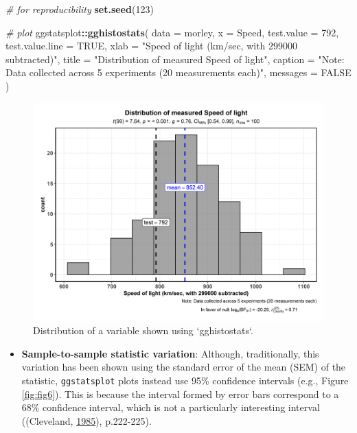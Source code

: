 \documentclass[]{article}
\newenvironment{Shaded}{\begin{snugshade}}{\end{snugshade}}
\newcommand{\CommentTok}[1]{\textcolor[rgb]{0.56,0.35,0.01}{\textit{#1}}}
\newcommand{\DataTypeTok}[1]{\textcolor[rgb]{0.13,0.29,0.53}{#1}}
\newcommand{\DecValTok}[1]{\textcolor[rgb]{0.00,0.00,0.81}{#1}}
\newcommand{\KeywordTok}[1]{\textcolor[rgb]{0.13,0.29,0.53}{\textbf{#1}}}
\newcommand{\NormalTok}[1]{#1}
\newcommand{\OperatorTok}[1]{\textcolor[rgb]{0.81,0.36,0.00}{\textbf{#1}}}
\newcommand{\OtherTok}[1]{\textcolor[rgb]{0.56,0.35,0.01}{#1}}
\newcommand{\StringTok}[1]{\textcolor[rgb]{0.31,0.60,0.02}{#1}}
\providecommand{\tightlist}{%
  \setlength{\itemsep}{0pt}\setlength{\parskip}{0pt}}
\begin{document}
\begin{Shaded}
\begin{Highlighting}[]
\CommentTok{# for reproducibility}
\KeywordTok{set.seed}\NormalTok{(}\DecValTok{123}\NormalTok{)}

\CommentTok{# plot}
\NormalTok{ggstatsplot}\OperatorTok{::}\KeywordTok{gghistostats}\NormalTok{(}
  \DataTypeTok{data =}\NormalTok{ morley,}
  \DataTypeTok{x =}\NormalTok{ Speed,}
  \DataTypeTok{test.value =} \DecValTok{792}\NormalTok{,}
  \DataTypeTok{test.value.line =} \OtherTok{TRUE}\NormalTok{,}
  \DataTypeTok{xlab =} \StringTok{"Speed of light (km/sec, with 299000 subtracted)"}\NormalTok{,}
  \DataTypeTok{title =} \StringTok{"Distribution of measured Speed of light"}\NormalTok{,}
  \DataTypeTok{caption =} \StringTok{"Note: Data collected across 5 experiments (20 measurements each)"}\NormalTok{,}
  \DataTypeTok{messages =} \OtherTok{FALSE}
\NormalTok{)}
\end{Highlighting}
\end{Shaded}

\begin{figure}[H]
\includegraphics[width=1\linewidth]{./figures/paper-fig5-1} \caption{Distribution of a variable shown using `gghistostats`.}\label{fig:fig5}
\end{figure}

\begin{itemize}
\tightlist
\item
  \textbf{Sample-to-sample statistic variation}: Although, traditionally, this
  variation has been shown using the standard error of the mean (SEM) of the
  statistic, \texttt{ggstatsplot} plots instead use 95\% confidence intervals (e.g.,
  Figure \ref{fig:fig6}). This is because the interval formed by error bars
  correspond to a 68\% confidence interval, which is not a particularly
  interesting interval ((Cleveland, \protect\hyperlink{ref-clevelandElementsGraphingData1985}{1985}), p.222-225).
\end{itemize}
\end{document}
